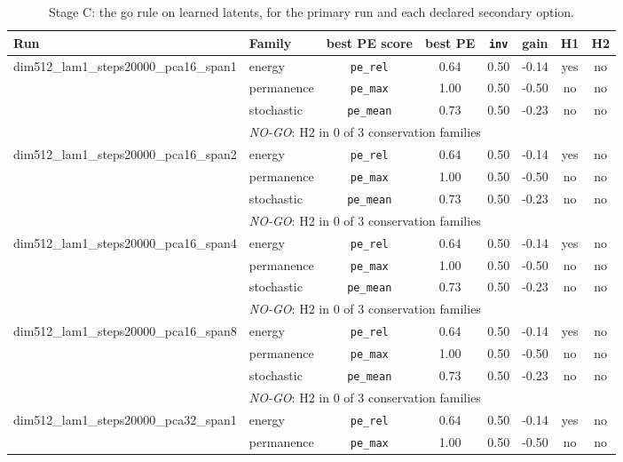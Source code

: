 \begin{table}[t]\centering\small
\caption{Stage C: the go rule on learned latents, for the primary run and each declared secondary option.}\label{tab:stageCverdict}
\begin{adjustbox}{max width=\linewidth}\begin{tabular}{llcccccc}\toprule
Run & Family & best PE score & best PE & \texttt{inv} & gain & H1 & H2\\\midrule
dim512\_lam1\_steps20000\_pca16\_span1 & energy & \texttt{pe\_rel} & 0.64 & 0.50 & -0.14 & yes & no\\
 & permanence & \texttt{pe\_max} & 1.00 & 0.50 & -0.50 & no & no\\
 & stochastic & \texttt{pe\_mean} & 0.73 & 0.50 & -0.23 & no & no\\
& \multicolumn{7}{l}{\emph{NO-GO}: H2 in 0 of 3 conservation families}\\\midrule
dim512\_lam1\_steps20000\_pca16\_span2 & energy & \texttt{pe\_rel} & 0.64 & 0.50 & -0.14 & yes & no\\
 & permanence & \texttt{pe\_max} & 1.00 & 0.50 & -0.50 & no & no\\
 & stochastic & \texttt{pe\_mean} & 0.73 & 0.50 & -0.23 & no & no\\
& \multicolumn{7}{l}{\emph{NO-GO}: H2 in 0 of 3 conservation families}\\\midrule
dim512\_lam1\_steps20000\_pca16\_span4 & energy & \texttt{pe\_rel} & 0.64 & 0.50 & -0.14 & yes & no\\
 & permanence & \texttt{pe\_max} & 1.00 & 0.50 & -0.50 & no & no\\
 & stochastic & \texttt{pe\_mean} & 0.73 & 0.50 & -0.23 & no & no\\
& \multicolumn{7}{l}{\emph{NO-GO}: H2 in 0 of 3 conservation families}\\\midrule
dim512\_lam1\_steps20000\_pca16\_span8 & energy & \texttt{pe\_rel} & 0.64 & 0.50 & -0.14 & yes & no\\
 & permanence & \texttt{pe\_max} & 1.00 & 0.50 & -0.50 & no & no\\
 & stochastic & \texttt{pe\_mean} & 0.73 & 0.50 & -0.23 & no & no\\
& \multicolumn{7}{l}{\emph{NO-GO}: H2 in 0 of 3 conservation families}\\\midrule
dim512\_lam1\_steps20000\_pca32\_span1 & energy & \texttt{pe\_rel} & 0.64 & 0.50 & -0.14 & yes & no\\
 & permanence & \texttt{pe\_max} & 1.00 & 0.50 & -0.50 & no & no\\

\end{tabular}
\end{adjustbox}
\end{table}

